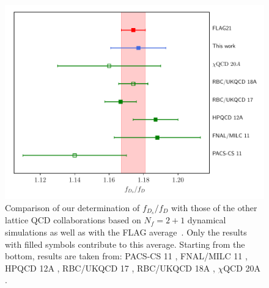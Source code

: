 \begin{figure}
	\centering
	\includegraphics[scale=0.7]{./cap6/figs/fds/ratio_fds_comparison.pdf}
	\caption{Comparison of our determination of $f_{D_s}/f_D$ with those of the other lattice QCD collaborations based on $N_f=2+1$ dynamical simulations as well as with the FLAG average~\cite{FlavourLatticeAveragingGroupFLAG:2021npn}. Only the results with filled symbols contribute to this average. Starting from the bottom, results are taken from:  PACS-CS 11 \cite{PACS-CS:2011ngu}, FNAL/MILC 11  \cite{FermilabLattice:2011njy}, HPQCD 12A \cite{Na:2012iu},  RBC/UKQCD 17 \cite{Boyle:2017jwu}, RBC/UKQCD 18A \cite{Boyle:2018knm},  $\chi$QCD 20A \cite{Chen:2020qma}. }
	\label{fig:fds_over_fd_comparison}
\end{figure}





